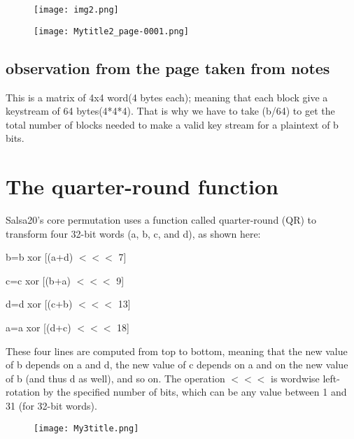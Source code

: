 \documentclass{article}
\begin{document}
\begin{figure} [H]
    \centering
    \texttt{[image: img2.png]}
\end{figure}




\begin{figure} [H]
    \centering
    \texttt{[image: Mytitle2\_page-0001.png]}
\end{figure}



\subsection{observation from the page taken from notes}


This is a matrix of 4x4 word(4 bytes each);
meaning that each block give a keystream of 64 bytes(4*4*4).
That is why we have to take (b/64) to get the total number of blocks needed to
make a valid key stream for a plaintext of b bits.




\section{The quarter-round function}


Salsa20’s core permutation uses a function called quarter-round (QR) to
transform four 32-bit words (a, b, c, and d), as shown here:


   b=b xor [(a+d) \(<<<\) 7]
   
   
   c=c xor [(b+a) \(<<<\) 9]
   
   
   d=d xor [(c+b) \(<<<\) 13]
   
   
   a=a xor [(d+c) \(<<<\) 18]

These four lines are computed from top to bottom, meaning that the
new value of b depends on a and d, the new value of c depends on a and on
the new value of b (and thus d as well), and so on.
The operation \(<<<\) is wordwise left-rotation by the specified number of
bits, which can be any value between 1 and 31 (for 32-bit words).



\begin{figure} [H]
    \centering
    \texttt{[image: My3title.png]}
\end{figure}
\end{document}
